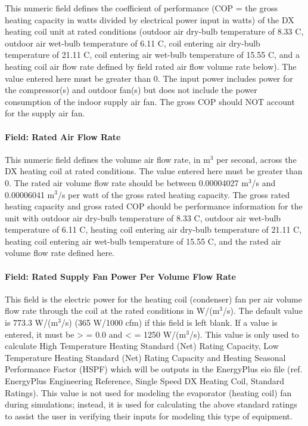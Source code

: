 This numeric field defines the coefficient of performance (COP = the gross heating capacity in watts divided by electrical power input in watts) of the DX heating coil unit at rated conditions (outdoor air dry-bulb temperature of 8.33 C, outdoor air wet-bulb temperature of 6.11 C, coil entering air dry-bulb temperature of 21.11 C, coil entering air wet-bulb temperature of 15.55 C, and a heating coil air flow rate defined by field rated air flow volume rate below). The value entered here must be greater than 0. The input power includes power for the compressor(s) and outdoor fan(s) but does not include the power consumption of the indoor supply air fan. The gross COP should NOT account for the supply air fan.

\paragraph{Field: Rated Air Flow Rate}\label{field-rated-air-flow-rate-4}

This numeric field defines the volume air flow rate, in m\(^{3}\) per second, across the DX heating coil at rated conditions. The value entered here must be greater than 0. The rated air volume flow rate should be between 0.00004027 m\(^{3}\)/s and 0.00006041 m\(^{3}\)/s per watt of the gross rated heating capacity. The gross rated heating capacity and gross rated COP should be performance information for the unit with outdoor air dry-bulb temperature of 8.33 C, outdoor air wet-bulb temperature of 6.11 C, heating coil entering air dry-bulb temperature of 21.11 C, heating coil entering air wet-bulb temperature of 15.55 C, and the rated air volume flow rate defined here.

\paragraph{Field: Rated Supply Fan Power Per Volume Flow Rate}\label{field-rated-evaporator-fan-power-per-volume-flow-rate-1}

This field is the electric power for the heating coil (condenser) fan per air volume flow rate through the coil at the rated conditions in W/(m\(^{3}\)/s). The default value is 773.3 W/(m\(^{3}\)/s) (365 W/1000 cfm) if this field is left blank. If a value is entered, it must be \textgreater{} = 0.0 and \textless{} = 1250 W/(m\(^{3}\)/s). This value is only used to calculate High Temperature Heating Standard (Net) Rating Capacity, Low Temperature Heating Standard (Net) Rating Capacity and Heating Seasonal Performance Factor (HSPF) which will be outputs in the EnergyPlus eio file (ref. EnergyPlus Engineering Reference, Single Speed DX Heating Coil, Standard Ratings). This value is not used for modeling the evaporator (heating coil) fan during simulations; instead, it is used for calculating the above standard ratings to assist the user in verifying their inputs for modeling this type of equipment.

